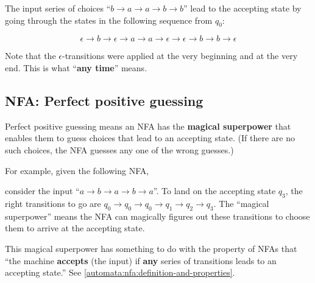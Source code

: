 \documentclass[12pt, letterpaper, oneside]{book}
\begin{document}
The input series of choices ``$b \rightarrow a \rightarrow a \rightarrow b \rightarrow b$'' lead to the accepting state
by going through the states in the following sequence from $q_0$:

\[
  \epsilon \rightarrow b \rightarrow \epsilon \rightarrow a \rightarrow a \rightarrow \epsilon \rightarrow \epsilon
  \rightarrow b \rightarrow b \rightarrow \epsilon
\]

Note that the $\epsilon$-transitions were applied at the very beginning and at the very end. This is what ``\textbf{any
  time}'' means.

\subsection{NFA: Perfect positive guessing} \label{automata:nfa:perfect-positive-guessing}

Perfect positive guessing means an NFA has the \textbf{magical superpower} that enables them to guess choices that lead
to an accepting state. (If there are no such choices, the NFA guesses any one of the wrong guesses.)

For example, given the following NFA,


consider the input ``$a \rightarrow b \rightarrow a \rightarrow b \rightarrow a$''. To land on the accepting state
$q_3$, the right transitions to go are $q_0 \rightarrow q_0 \rightarrow q_0 \rightarrow q_1 \rightarrow q_2 \rightarrow
  q_3$. The ``magical superpower'' means the NFA can magically figures out these transitions to choose them to arrive
at the accepting state.

This magical superpower has something to do with the property of NFAs that ``the machine \textbf{accepts} (the input)
if \textbf{any} series of transitions leads to an accepting state.'' See \ref{automata:nfa:definition-and-properties}.
\end{document}
